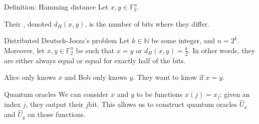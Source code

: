 \documentclass[a4paper]{article}
\begin{document}
\begin{parag}{Definition: Hamming distance}
    Let $x, y \in \mathbb{F}_2^n$.

    Their , denoted $d_H\left(x, y\right)$, is the number of bits where they differ. 
\end{parag}

\begin{parag}{Distributed Deutsch-Josza's problem}
    Let $k \in \mathbb{N}$ be some integer, and $n = 2^k$. Moreover, let $x, y \in \mathbb{F}_2^n$ be such that $x = y$ or $d_H\left(x, y\right) = \frac{k}{2}$. In other words, they are either always equal or equal for exactly half of the bits.

    Alice only knows $x$ and Bob only knows $y$. They want to know if $x = y$.

    \begin{subparag}{Quantum oracles}
        We can consider $x$ and $y$ to be functions $x\left(j\right) = x_j$: given an index $j$, they output their $j$\Th bit. This allows us to construct quantum oracles $\hat{U}_x$ and $\hat{U}_y$ on those functions.
    \end{subparag}
\end{parag}
\end{document}
